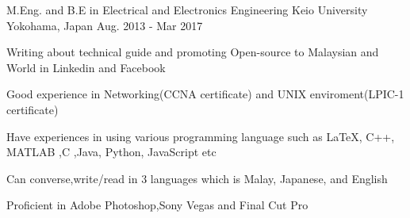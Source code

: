 



\begin{cventries}
    {M.Eng. and B.E in Electrical and Electronics Engineering} %
    {Keio University} %
    {Yokohama, Japan} %
    {Aug. 2013 - Mar 2017} %
    {
      \begin{cvitems} %
        \item {Writing about technical guide and promoting Open-source to Malaysian and World in Linkedin and Facebook}
		\item {Good experience in Networking(CCNA certificate) and UNIX enviroment(LPIC-1 certificate) }
        \item {Have experiences in using various programming language such as \LaTeX , C++, MATLAB ,C ,Java, Python, JavaScript etc}
        \item {Can converse,write/read  in 3 languages which is Malay, Japanese, and English }
        \item {Proficient in Adobe Photoshop,Sony Vegas and Final Cut Pro}
      \end{cvitems}
    }
\end{cventries}
